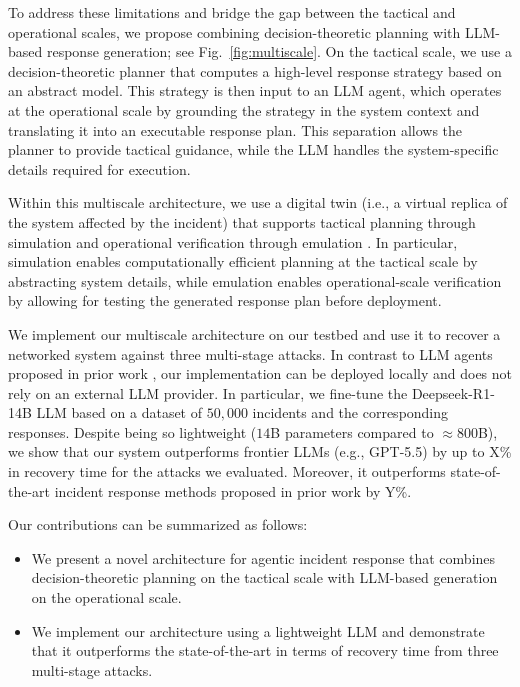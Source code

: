 \documentclass[sigconf]{acmart}
\begin{document}
To address these limitations and bridge the gap between the tactical and operational scales, we propose combining decision-theoretic planning with LLM-based response generation; see Fig.~\ref{fig:multiscale}. On the tactical scale, we use a decision-theoretic planner that computes a high-level response strategy based on an abstract model. This strategy is then input to an LLM agent, which operates at the operational scale by grounding the strategy in the system context and translating it into an executable response plan. This separation allows the planner to provide tactical guidance, while the LLM handles the system-specific details required for execution.

Within this multiscale architecture, we use a digital twin (i.e., a virtual replica of the system affected by the incident) that supports tactical planning through simulation and operational verification through emulation \cite{hammarcsle}. In particular, simulation enables computationally efficient planning at the tactical scale by abstracting system details, while emulation enables operational-scale verification by allowing for testing the generated response plan before deployment. 

We implement our multiscale architecture on our testbed and use it to recover a networked system against three multi-stage attacks. In contrast to LLM agents proposed in prior work \cite{hamoun25llm-acd, cardenas25llm4acd,guo25ircopilot}, our implementation can be deployed locally and does not rely on an external LLM provider. In particular, we fine-tune  the Deepseek-R1-14B LLM \cite{deepseekai2025deepseekr1incentivizingreasoningcapability} based on a dataset of $50,000$ incidents and the corresponding responses. Despite being so lightweight ($14$B parameters compared to $\approx 800$B), we show that our system outperforms frontier LLMs (e.g., GPT-5.5) by up to X\% in recovery time for the attacks we evaluated. Moreover, it outperforms state-of-the-art incident response methods proposed in prior work by Y\%.

Our contributions can be summarized as follows:
\begin{itemize}
  \item We present a novel architecture for agentic incident response that combines decision-theoretic planning on the tactical scale with LLM-based generation on the operational scale.
  \item We implement our architecture using a lightweight LLM and demonstrate that it outperforms the state-of-the-art in terms of recovery time from three multi-stage attacks.
\end{itemize} 
\end{document}
